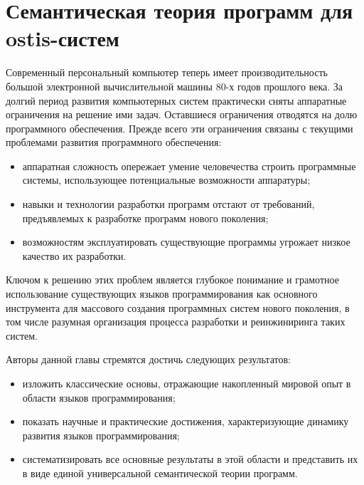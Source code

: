 \chapter{Семантическая теория программ для ostis-систем}
\label{chapter_programs}

\abstract{}

Современный персональный компьютер теперь имеет производительность большой электронной вычислительной машины 80-х годов
прошлого века. За долгий период развития компьютерных систем практически сняты аппаратные ограничения на решение ими
задач. Оставшиеся ограничения отводятся на долю программного обеспечения.
Прежде всего эти ограничения связаны с текущими проблемами развития программного обеспечения:
\begin{itemize}
    \item аппаратная сложность опережает умение человечества строить программные системы, использующее потенциальные
    возможности аппаратуры;
    \item навыки и технологии разработки программ отстают от требований, предъявлемых к разработке программ нового
    поколения;
    \item возможностям эксплуатировать существующие программы угрожает низкое качество их разработки.
\end{itemize}
Ключом к решению этих проблем является глубокое понимание и грамотное использование существующих языков программирования 
как основного инструмента для массового создания программных систем нового поколения, в том числе разумная организация 
процесса разработки и реинжиниринга таких систем.

Авторы данной главы стремятся достичь следующих результатов:
\begin{itemize}
    \item изложить классические основы, отражающие накопленный мировой опыт в области языков программирования;
    \item показать научные и практические достижения, характеризующие динамику развития языков программирования;
    \item систематизировать все основные результаты в этой области и представить их в виде единой универсальной
    семантической теории программ.
\end{itemize}

